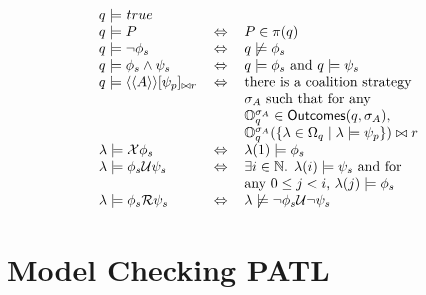 \documentclass[times, 10 pt,twocolumn]{article}
\newcommand{\mb}[1]{\mathbb{#1}}
\newcommand{\mc}[1]{\mathcal{#1}}
\newcommand{\lla}{\langle\langle}
\newcommand{\rra}{\rangle\rangle}
\begin{document}
\[
\begin{tabular}{lll}
 $q\models$    $true$ \\

 $q \models P$  & $\Leftrightarrow$   & $P\in \pi(q)$\\
 $q \models \neg \phi_s$ & $\Leftrightarrow$   & $q\not\models \phi_s$\\
 $q \models \phi_s \wedge \psi_s$  & $\Leftrightarrow$   & $q \models \phi_s$ and $q \models \psi_s$\\

 $q \models \lla A\rra [\psi_p]_{\bowtie r}$ & $\Leftrightarrow$   & there
is a coalition strategy\\
& & $\sigma_A$ such that for any \\
& & $\mathbb{O}_q^{\sigma_A}\in {\rm\sf Outcomes}(q, \sigma_A)$,
\\
& & $\mathbb{O}_q^{\sigma_A}(\{\lambda\in \Omega_q \mid
\lambda\models \psi_p\})\bowtie r$\\

 $\lambda \models \mc{X}\phi_s$ & $\Leftrightarrow$   &
 $\lambda(1)\models \phi_s$\\

 $\lambda \models \phi_s\mc{U}\psi_s$ & $\Leftrightarrow$   &
 $\exists i\in \mb{N}$. $\lambda(i)\models \psi_s$ and for \\
 & & any $0\leq j<i$, $\lambda(j)\models
 \phi_s$\\

 $\lambda \models \phi_s\mc{R}\psi_s$ & $\Leftrightarrow$   &
 $\lambda \not\models \neg \phi_s\mc{U} \neg \psi_s$\\
\end{tabular}
\]

%
%


\section{Model Checking PATL} \label{sec3}
\end{document}
